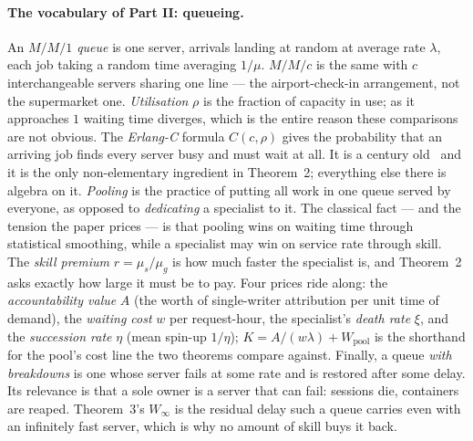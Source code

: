 \documentclass[11pt,a4paper]{article}
\begin{document}
\paragraph{The vocabulary of Part II: queueing.} An \emph{$M/M/1$ queue} is one server, arrivals landing at random at average
rate $\lambda$, each job taking a random time averaging $1/\mu$. \emph{$M/M/c$} is the same with $c$ interchangeable servers
sharing one line --- the airport-check-in arrangement, not the supermarket one. \emph{Utilisation} $\rho$ is the fraction of
capacity in use; as it approaches $1$ waiting time diverges, which is the entire reason these comparisons are not obvious.
The \emph{Erlang-C} formula $C(c,\rho)$ gives the probability that an arriving job finds every server busy and must wait at
all. It is a century old~\cite{erlang17} and it is the only non-elementary ingredient in Theorem~2; everything else there is
algebra on it. \emph{Pooling} is the practice of putting all work in one queue served by everyone, as opposed to
\emph{dedicating} a specialist to it. The classical fact --- and the tension the paper prices --- is that pooling wins on
waiting time through statistical smoothing, while a specialist may win on service rate through skill. The \emph{skill premium}
$r = \mu_s/\mu_g$ is how much faster the specialist is, and Theorem~2 asks exactly how large it must be to pay. Four prices ride
along: the \emph{accountability value} $A$ (the worth of single-writer attribution per unit time of demand), the \emph{waiting
cost} $w$ per request-hour, the specialist's \emph{death rate} $\xi$, and the \emph{succession rate} $\eta$ (mean spin-up
$1/\eta$); $K = A/(w\lambda) + W_{\mathrm{pool}}$ is the shorthand for the pool's cost line the two theorems compare against.
Finally, a queue \emph{with breakdowns} is one whose server fails at some rate and is restored after some delay. Its
relevance is that a sole owner is a server that can fail: sessions die, containers are reaped. Theorem~3's $W_\infty$ is the
residual delay such a queue carries even with an infinitely fast server, which is why no amount of skill buys it back.
\end{document}

